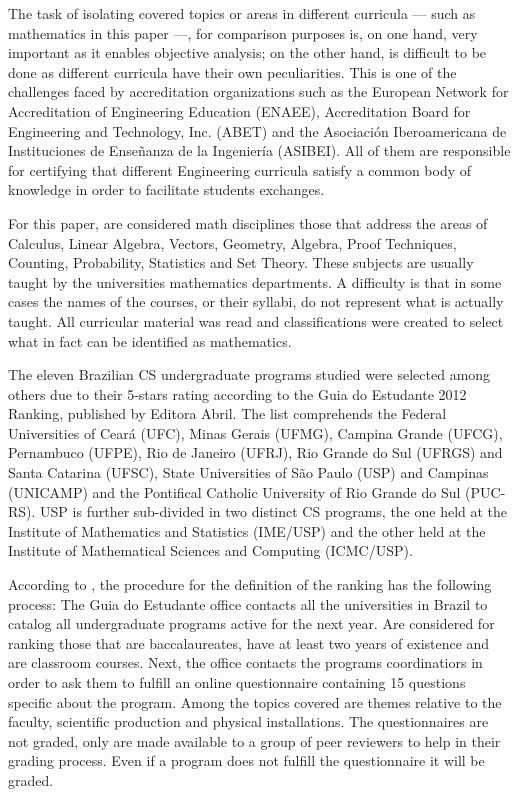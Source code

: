 \documentclass[conference]{IEEEtran}
\begin{document}
	The task of isolating covered topics or areas in different curricula — such as mathematics in this paper —, for comparison purposes is, on one hand, very important as it enables objective analysis; on the other hand, is difficult to be done as different curricula have their own peculiarities. This is one of the challenges faced by accreditation organizations such as the European Network for Accreditation of Engineering Education (ENAEE), Accreditation Board for Engineering and Technology, Inc. (ABET) and the Asociación Iberoamericana de Instituciones de Enseñanza de la Ingeniería (ASIBEI). All of them are responsible for certifying that different Engineering curricula satisfy a common body of knowledge in order to facilitate students exchanges.
	
	For this paper, are considered math disciplines those that address the areas of Calculus, Linear Algebra, Vectors, Geometry, Algebra, Proof Techniques, Counting, Probability, Statistics and Set Theory. These subjects are usually taught by the universities mathematics departments. A difficulty is that in some cases the names of the courses, or their syllabi, do not represent what is actually taught. All curricular material was read and classifications were created to select what in fact can be identified as mathematics.

	The eleven Brazilian CS undergraduate programs studied were selected among others due to their 5-stars rating according to the Guia do Estudante 2012 Ranking, published by Editora Abril. \cite{guia_estudante} The list comprehends the Federal Universities of Ceará (UFC), Minas Gerais (UFMG), Campina Grande (UFCG), Pernambuco (UFPE), Rio de Janeiro (UFRJ), Rio Grande do Sul (UFRGS) and Santa Catarina (UFSC), State Universities of São Paulo (USP) and Campinas (UNICAMP) and the Pontifical Catholic University of Rio Grande do Sul (PUC-RS). USP is further sub-divided in two distinct CS programs, the one held at the Institute of Mathematics and Statistics (IME/USP) and the other held at the Institute of Mathematical Sciences and Computing (ICMC/USP).
	
	According to \cite{guia_estudante:metodologia}, the procedure for the definition of the ranking has the following process: The Guia do Estudante office contacts all the universities in Brazil to catalog all undergraduate programs active for the next year. Are considered for ranking those that are baccalaureates, have at least two years of existence and are classroom courses. Next, the office contacts the programs coordinatiors in order to ask them to fulfill an online questionnaire containing 15 questions specific about the program. Among the topics covered are themes relative to the faculty, scientific production and physical installations. The questionnaires are not graded, only are made available to a group of peer reviewers to help in their grading process. Even if a program does not fulfill the questionnaire it will be graded.
\end{document}
